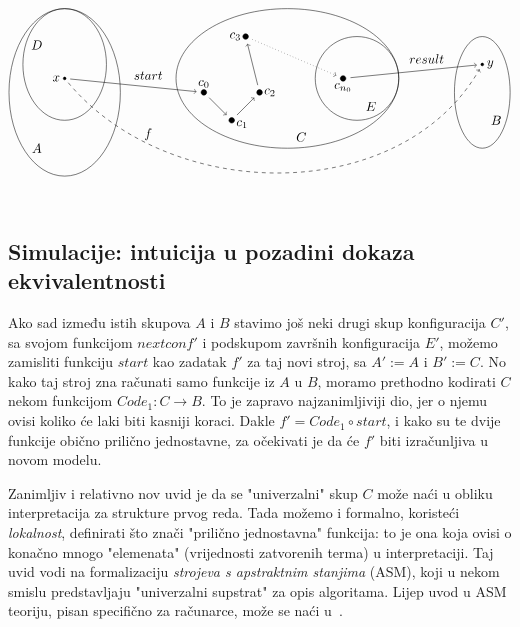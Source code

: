 \begin{equation}\label{dia:alg}
\begin{tikzpicture}[scale=0.75,baseline=(c0)]
\draw (0,0) ellipse (2 and 3);
\draw (8,0.5) ellipse (4 and 2.5);
\draw (15,0) ellipse (1 and 2);
\draw (0,1) ellipse (1.5 and 2);
\draw (10.5,0.5) circle (1.5);
\draw[fill] (0,0.5) coordinate (x) circle (0.05) node[left]{$x$};
\node at(-1,1.7) {$D$};
\node at(-1,-2) {$A$};
\node at(8.5,-1.6) {$C$};
\node at(11,-0.5) {$E$};
\node at(15.5,-1) {$B$};
\node at(3,0.6) {$start$};
\node at(13,1.2) {$result$};
\node at(3,-1.5) {$f$};
\draw[fill] (5,0) coordinate (c0) circle (0.1) node[above]{$c_0$};
\draw[fill] (6,-1) coordinate (c1) circle (0.1) node[right,yshift=-3]{$c_1$};
\draw[fill] (7,0) coordinate (c2) circle (0.1) node[right]{$c_2$};
\draw[fill] (6.5,2) coordinate (c3) circle (0.1) node[left]{$c_3$};
\draw[fill] (10,0.5) coordinate (cn0) circle (0.1) node[below]{$c_{n_0}$};
\draw[fill] (15,1) coordinate (y) circle (0.05) node[right]{$y$};
\draw[shorten <=1.5mm,shorten >=2mm,->] (x) -- (c0);
\draw[shorten <=2mm,shorten >=2mm,->] (c0) -- (c1);
\draw[shorten <=2mm,shorten >=2mm,->] (c1) -- (c2);
\draw[shorten <=2mm,shorten >=2mm,->] (c2) -- (c3);
\draw[dotted,shorten <=2mm,shorten >=2mm,->] (c3) -- (cn0);
\draw[shorten <=2mm,shorten >=1.5mm,->] (cn0) -- (y);
\draw[shorten <=1.5mm, shorten >=1.5mm,dashed,->] (x) to[in=240,out=-50] (y);
\end{tikzpicture}    
\end{equation}

\subsection{Simulacije: intuicija u pozadini dokaza ekvivalentnosti}

Ako sad između istih skupova $A$ i $B$ stavimo još neki drugi skup konfiguracija $C'$, sa svojom funkcijom $nextconf'$ i podskupom završnih konfiguracija $E'$, možemo zamisliti funkciju $start$ kao zadatak $f'$ za taj novi stroj, sa $A':=A$ i $B':=C$. No kako taj stroj zna računati samo funkcije iz $A$ u $B$, moramo prethodno kodirati $C$ nekom funkcijom $Code_1\colon C\to B$. To je zapravo najzanimljiviji dio, jer o njemu ovisi koliko će laki biti kasniji koraci. Dakle $f'=Code_1\circ start$, i kako su te dvije funkcije obično prilično jednostavne, za očekivati je da će $f'$ biti izračunljiva u novom modelu.

\begin{napomena}\label{nap:ASM}
Zanimljiv i relativno nov uvid je da se "univerzalni" skup $C$ može naći u obliku interpretacija za strukture prvog reda. Tada možemo i formalno, koristeći \emph{lokalnost}, definirati što znači "prilično jednostavna" funkcija: to je ona koja ovisi o konačno mnogo "elemenata" (vrijednosti zatvorenih terma) u interpretaciji. Taj uvid vodi na formalizaciju \emph{strojeva s apstraktnim stanjima} (ASM), koji u nekom smislu predstavljaju "univerzalni supstrat" za opis algoritama. Lijep uvod u ASM teoriju, pisan specifično za računarce, može se naći u~\cite{huggins}.
\end{napomena}

